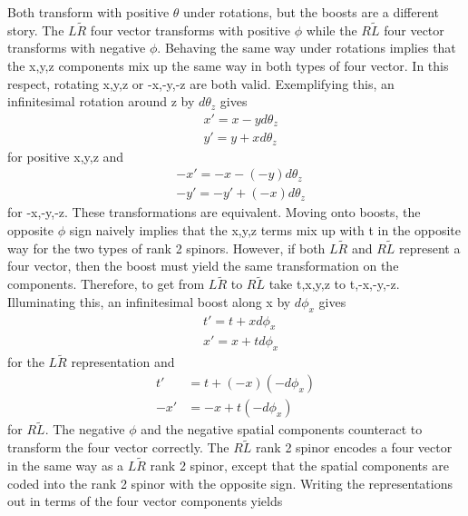 Both transform with positive $\theta$ under rotations, but the boosts are a different story. The $L\tilde{R}$ four vector transforms with positive $\phi$ while the $R\tilde{L}$ four vector transforms with negative $\phi$. Behaving the same way under rotations implies that the x,y,z components mix up the same way in both types of four vector. In this respect, rotating x,y,z or -x,-y,-z are both valid. Exemplifying this, an infinitesimal rotation around z by $d\theta_z$ gives 
\begin{equation}
\begin{split}
&x' = x - yd\theta_z \\
&y' = y + xd\theta_z
\end{split}
\end{equation}
for positive x,y,z and 
\begin{equation}
\begin{split}
&-x' = -x - (-y)d\theta_z \\
&-y' = -y' + (-x)d\theta_z
\end{split}
\end{equation}
for -x,-y,-z. These transformations are equivalent. Moving onto boosts, the opposite $\phi$ sign naively implies that the x,y,z terms mix up with t in the opposite way for the two types of rank 2 spinors. However, if both $L\tilde{R}$ and $R\tilde{L}$ represent a four vector, then the boost must yield the same transformation on the components. Therefore, to get from $L\tilde{R}$ to $R\tilde{L}$ take t,x,y,z to t,-x,-y,-z. Illuminating this, an infinitesimal boost along x by $d\phi_x$ gives 
\begin{equation}
\begin{split}
&t' = t + xd\phi_x \\
&x' = x + td\phi_x 
\end{split}
\end{equation}
for the $L\tilde{R}$ representation and 
\begin{equation}
\begin{split}
t' &= t + (-x)(-d\phi_x) \\ 
-x' &= -x + t(-d\phi_x)  
\end{split}
\end{equation}
for $R\tilde{L}$. The negative $\phi$ and the negative spatial components counteract to transform the four vector correctly. The $R\tilde{L}$ rank 2 spinor encodes a four vector in the same way as a $L\tilde{R}$ rank 2 spinor, except that the spatial components are coded into the rank 2 spinor with the opposite sign. Writing the representations out in terms of the four vector components yields
